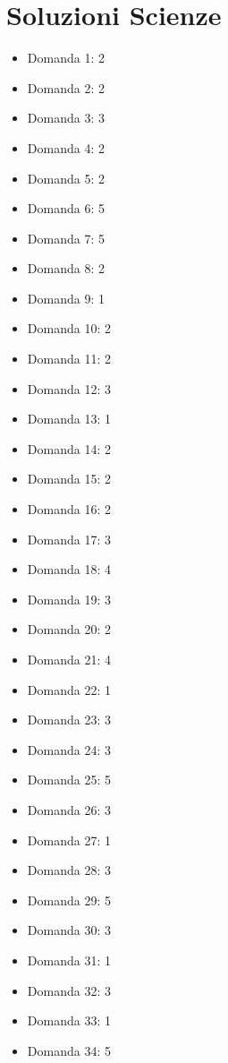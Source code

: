 \documentclass[20pt, a4paper]{article}
\begin{document}
\section*{Soluzioni Scienze}
\begin{itemize}[leftmargin=*]
\item [Scienze] Domanda 1: 2
\item [Scienze] Domanda 2: 2
\item [Scienze] Domanda 3: 3
\item [Scienze] Domanda 4: 2
\item [Scienze] Domanda 5: 2
\item [Scienze] Domanda 6: 5
\item [Scienze] Domanda 7: 5
\item [Scienze] Domanda 8: 2
\item [Scienze] Domanda 9: 1
\item [Scienze] Domanda 10: 2
\item [Scienze] Domanda 11: 2
\item [Scienze] Domanda 12: 3
\item [Scienze] Domanda 13: 1
\item [Scienze] Domanda 14: 2
\item [Scienze] Domanda 15: 2
\item [Scienze] Domanda 16: 2
\item [Scienze] Domanda 17: 3
\item [Scienze] Domanda 18: 4
\item [Scienze] Domanda 19: 3
\item [Scienze] Domanda 20: 2
\item [Scienze] Domanda 21: 4
\item [Scienze] Domanda 22: 1
\item [Scienze] Domanda 23: 3
\item [Scienze] Domanda 24: 3
\item [Scienze] Domanda 25: 5
\item [Scienze] Domanda 26: 3
\item [Scienze] Domanda 27: 1
\item [Scienze] Domanda 28: 3
\item [Scienze] Domanda 29: 5
\item [Scienze] Domanda 30: 3
\item [Scienze] Domanda 31: 1
\item [Scienze] Domanda 32: 3
\item [Scienze] Domanda 33: 1
\item [Scienze] Domanda 34: 5

\end{itemize}
\end{document}
